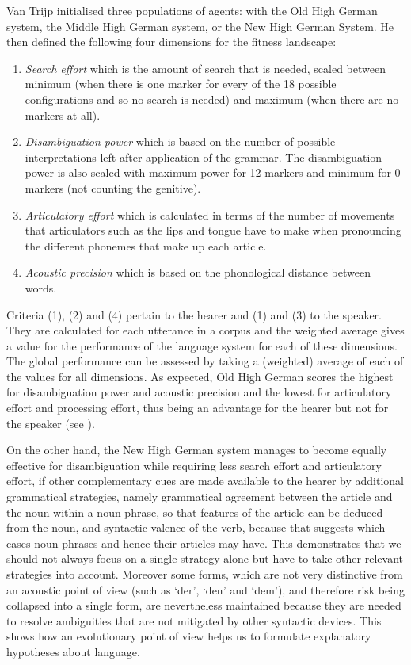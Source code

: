 Van Trijp initialised three populations of agents: with the Old High German system, 
the Middle High German system, or the New High German System. He then defined the following four dimensions for the 
fitness landscape: 
\begin{enumerate}
\item {\itshape Search effort} which is the amount of search that is needed, scaled between minimum (when there is one marker for every of 
the 18 possible configurations and so no search is needed) and maximum (when there are no markers at all).
\item {\itshape Disambiguation power} which is based on the number of possible interpretations left after application of the grammar. 
The disambiguation power is also scaled with maximum power for 12 markers and minimum for 0 markers (not counting the genitive). 
\item {\itshape Articulatory effort} which is calculated in terms of the number of movements that articulators such as the lips and 
tongue have to make when pronouncing the different phonemes that make up each article. 
\item {\itshape Acoustic precision} which is based on the phonological distance between words.
\end{enumerate}
Criteria (1), (2) and (4) pertain to the hearer and (1) and (3) to the speaker. They are calculated for each utterance
in a corpus and the weighted average gives a value for the performance of the language system for each of these dimensions. The global 
performance can be assessed by taking a (weighted) average of each of the values for all dimensions. 
As expected, Old High German scores the highest for disambiguation power and acoustic precision and the lowest for articulatory effort 
and processing effort, thus being an advantage for the hearer but not for the speaker (see ). 

On the other hand, the New High German system manages to become equally effective for disambiguation while requiring less search effort
and articulatory effort, if other complementary cues are made available to the hearer by additional grammatical 
strategies, namely grammatical agreement between the article and the noun within a noun phrase, so 
that features of the article can be deduced from the noun, and syntactic valence of the verb, because that suggests
which cases noun-phrases and hence their articles may have. 
This demonstrates that we should not always focus on a single strategy alone 
but have to take other relevant strategies into account. 
Moreover some forms, which are not very distinctive from an acoustic point of 
view (such as `der', `den' and `dem'), and therefore risk being collapsed into a single form, are 
nevertheless maintained because they are needed to resolve ambiguities that are not mitigated by 
other syntactic devices. This shows how an evolutionary point of view helps us to formulate explanatory hypotheses about language. 

